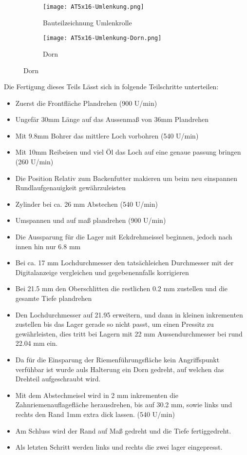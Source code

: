 \begin{figure}[H]
    \centering
    \begin{subfigure}{.6\textwidth}
        \centering
        \texttt{[image: AT5x16-Umlenkung.png]}
        \caption{Bauteilzeichnung Umlenkrolle}
        \label{UmlenkrolleBTZ}
        
    \end{subfigure}%
    \begin{subfigure}{.4\textwidth}
        \centering
        \texttt{[image: AT5x16-Umlenkung-Dorn.png]}
        \caption{Dorn}
        \label{DornBTZ}
    \end{subfigure}
\end{figure}

Die Fertigung dieses Teils Lässt sich in folgende Teilschritte unterteilen:
\begin{itemize}
    \setlength\itemsep{0mm}
    \item Zuerst die Frontfläche Plandrehen (900 U/min)
    \item Ungefär 30mm Länge auf das Aussenmaß von 36mm Plandrehen
    \item Mit 9.8mm Bohrer das mittlere Loch vorbohren (540 U/min)
    \item Mit 10mm Reibeisen und viel Öl das Loch auf eine genaue passung bringen (260 U/min)
    \item Die Position Relativ zum Backenfutter makieren um beim neu einspannen Rundlaufgenauigkeit gewährzuleisten
    \item Zylinder bei ca. 26 mm Abstechen (540 U/min)
    \item Umspannen und auf maß plandrehen (900 U/min)
    \item Die Aussparung für die Lager mit Eckdrehmeissel beginnen, jedoch nach innen hin nur 6.8 mm 
    \item Bei ca. 17 mm Lochdurchmesser den tatsächleichen Durchmesser mit der Digitalanzeige vergleichen und gegebenennfalls korrigieren
    \item Bei 21.5 mm den Oberschlitten die restlichen 0.2 mm zustellen und die gesamte Tiefe plandrehen
    \item Den Lochdurchmesser auf 21.95 erweitern, und dann in kleinen inkrementen zustellen bis das Lager gerade so nicht passt, um einen Pressitz zu gewährleisten, dies tritt bei Lagern mit 22 mm Aussendurchmesser bei rund 22.04 mm ein.
    \item Da für die Einsparung der Riemenführungsfläche kein Angriffspunkt verfühbar ist wurde auls Halterung ein Dorn gedreht, auf welchen das Drehteil aufgeschraubt wird.
    \item Mit dem Abstechmeisel wird in 2 mm inkrementen die Zahnriemenauflagefläche herausdrehen, bis auf 30.2 mm, sowie links und rechts den Rand 1mm extra dick lassen. (540 U/min)
    \item Am Schluss wird der Rand auf Maß gedreht und die Tiefe fertiggedreht. 
    \item Als letzten Schritt werden links und rechts die zwei lager eingepresst.
\end{itemize}

